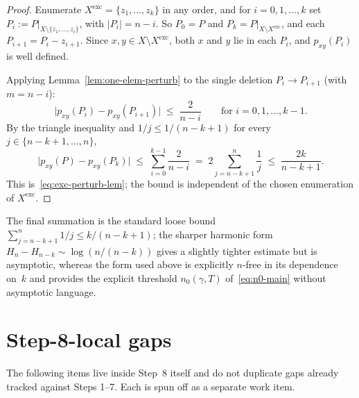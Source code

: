 \begin{proof}
Enumerate $X^{\mathrm{exc}} = \{z_1, \ldots, z_k\}$ in any order, and
for $i = 0, 1, \ldots, k$ set
$P_i := P|_{X \setminus \{z_1, \ldots, z_i\}}$, with $|P_i| = n - i$.
So $P_0 = P$ and $P_k = P|_{X \setminus X^{\mathrm{exc}}}$, and each
$P_{i+1} = P_i - z_{i+1}$. Since $x, y \in
X \setminus X^{\mathrm{exc}}$, both $x$ and $y$ lie in each $P_i$, and
$p_{xy}(P_i)$ is well defined.

Applying Lemma~\ref{lem:one-elem-perturb} to the single deletion
$P_i \to P_{i+1}$ (with $m = n - i$):
\begin{equation}\label{eq:per-step}
  \bigl|p_{xy}(P_i) - p_{xy}(P_{i+1})\bigr| \;\le\; \frac{2}{n-i}
  \qquad\text{for } i = 0, 1, \ldots, k-1.
\end{equation}
By the triangle inequality and $1/j \le 1/(n-k+1)$ for every
$j \in \{n-k+1, \ldots, n\}$,
\[
  \bigl|p_{xy}(P) - p_{xy}(P_k)\bigr|
  \;\le\; \sum_{i=0}^{k-1}\frac{2}{n - i}
  \;=\; 2\sum_{j=n-k+1}^{n}\frac{1}{j}
  \;\le\; \frac{2k}{n - k + 1}.
\]
This is~\eqref{eq:exc-perturb-lem}; the bound is independent of the
chosen enumeration of $X^{\mathrm{exc}}$.
\end{proof}

\begin{remark}\label{rem:exc-perturb-sharp}
The final summation is the standard loose bound
$\sum_{j=n-k+1}^{n} 1/j \le k/(n-k+1)$; the sharper harmonic form
$H_n - H_{n-k} \sim \log(n/(n-k))$ gives a slightly tighter
estimate but is asymptotic, whereas the form used above is
explicitly $n$-free in its dependence on~$k$ and provides the
explicit threshold $n_0(\gamma, T)$ of~\eqref{eq:n0-main} without
asymptotic language.
\end{remark}

\section{Step-8-local gaps}

The following items live inside Step~8 itself and do not duplicate
gaps already tracked against Steps 1--7. Each is spun off as a
separate work item.


